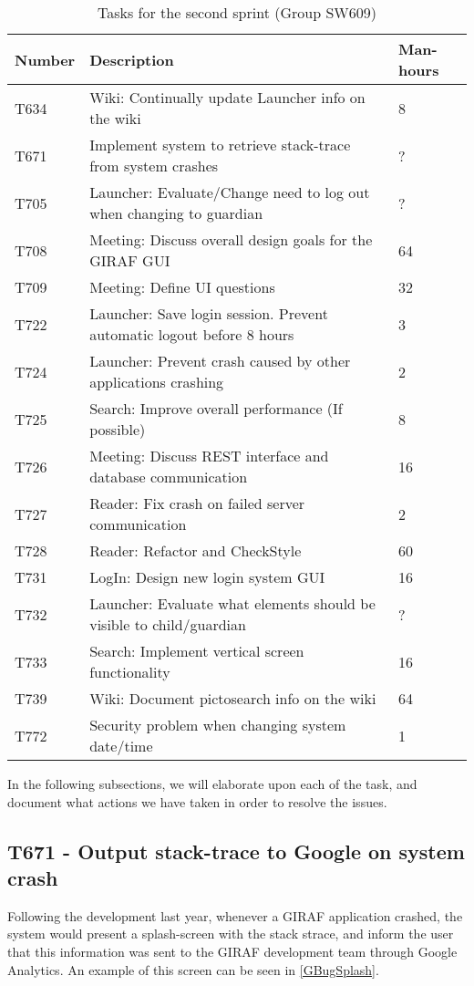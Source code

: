 \begin{table}[H]
\centering
\begin{tabular}{|l|l|l|}
\hline
Number	& Description & Man-hours												\\\hline
T634  	& Wiki: Continually update Launcher info on the wiki & 8\\\hline 
T671    & Implement system to retrieve stack-trace from system crashes & ?
\\\hline 
T705	& Launcher: Evaluate/Change need to log out when changing  to guardian
& ? \\\hline 
T708    & Meeting: Discuss overall design goals for the GIRAF GUI & 64\\\hline
T709	& Meeting: Define UI questions & 32 \\\hline 
T722   	& Launcher: Save login session. Prevent automatic logout before 8 hours
&3 \\\hline 
T724   	& Launcher: Prevent crash caused by other applications
crashing & 2 \\\hline 
T725  	& Search: Improve overall performance (If possible)	& 8 \\\hline 
T726    & Meeting: Discuss REST interface and database communication & 16
\\\hline 
T727    & Reader: Fix crash on failed server communication  & 2				\\\hline 
T728	& Reader: Refactor and CheckStyle  & 60\\\hline
T731    & LogIn: Design new login system GUI & 16     			\\\hline
T732    & Launcher: Evaluate what elements should be visible to
child/guardian & ?\\\hline 
T733    & Search: Implement vertical screen functionality & 16   			\\\hline 
T739    & Wiki: Document pictosearch info on the wiki & 64	\\\hline
T772    & Security problem when changing system date/time & 1 \\\hline
\end{tabular}
\caption{Tasks for the second sprint (Group SW609)} 
\label{SprintTwoTasks}    
\end{table} 

In the following subsections, we will elaborate upon each of the task, and
document what actions we have taken in order to resolve the issues.

\newpage
\subsection{T671 - Output stack-trace to Google on system crash}
Following the development last year, whenever a GIRAF application crashed, the
system would present a splash-screen with the stack strace, and inform the user
that this information was sent to the GIRAF development team through Google
Analytics. An example of this screen can be seen in \autoref{GBugSplash}.

